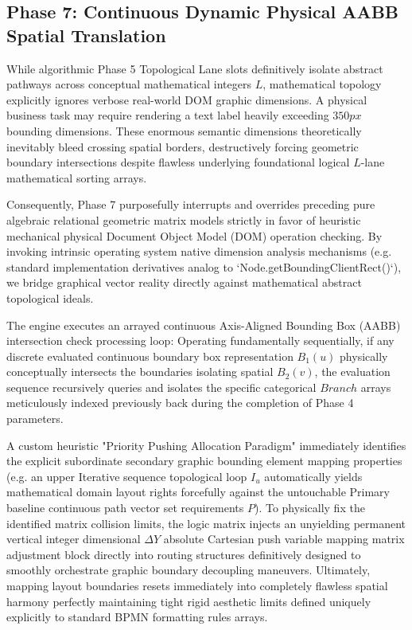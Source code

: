 \documentclass[fleqn,10pt]{wlscirep}
\begin{document}
\subsection*{Phase 7: Continuous Dynamic Physical AABB Spatial Translation}
While algorithmic Phase 5 Topological Lane slots definitively isolate abstract pathways across conceptual mathematical integers $L$, mathematical topology explicitly ignores verbose real-world DOM graphic dimensions. A physical business task may require rendering a text label heavily exceeding $350px$ bounding dimensions. These enormous semantic dimensions theoretically inevitably bleed crossing spatial borders, destructively forcing geometric boundary intersections despite flawless underlying foundational logical $L$-lane mathematical sorting arrays. 

Consequently, Phase 7 purposefully interrupts and overrides preceding pure algebraic relational geometric matrix models strictly in favor of heuristic mechanical physical Document Object Model (DOM) operation checking. By invoking intrinsic operating system native dimension analysis mechanisms (e.g. standard implementation derivatives analog to `Node.getBoundingClientRect()`), we bridge graphical vector reality directly against mathematical abstract topological ideals.

The engine executes an arrayed continuous Axis-Aligned Bounding Box (AABB) intersection check processing loop:
Operating fundamentally sequentially, if any discrete evaluated continuous boundary box representation $B_1(u)$ physically conceptually intersects the boundaries isolating spatial $B_2(v)$, the evaluation sequence recursively queries and isolates the specific categorical $Branch$ arrays meticulously indexed previously back during the completion of Phase 4 parameters. 

A custom heuristic "Priority Pushing Allocation Paradigm" immediately identifies the explicit subordinate secondary graphic bounding element mapping properties (e.g. an upper Iterative sequence topological loop $I_u$ automatically yields mathematical domain layout rights forcefully against the untouchable Primary baseline continuous path vector set requirements $P$). To physically fix the identified matrix collision limits, the logic matrix injects an unyielding permanent vertical integer dimensional $\Delta Y$ absolute Cartesian push variable mapping matrix adjustment block directly into routing structures definitively designed to smoothly orchestrate graphic boundary decoupling maneuvers. Ultimately, mapping layout boundaries resets immediately into completely flawless spatial harmony perfectly maintaining tight rigid aesthetic limits defined uniquely explicitly to standard BPMN formatting rules arrays.
\end{document}
